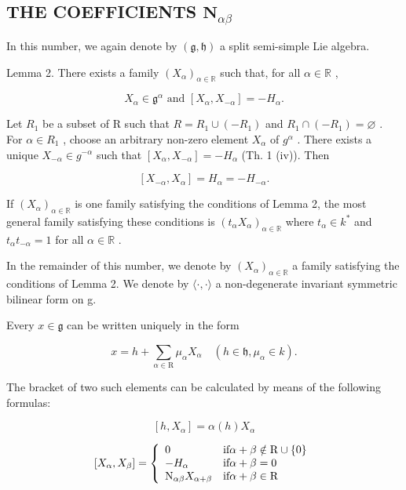 \subsection{\texorpdfstring{THE COEFFICIENTS \(\mathbf{N}_{\alpha \beta}\)}{THE COEFFICIENTS \textbackslash mathbf\{N\}\_\{\textbackslash alpha \textbackslash beta\}}}

In this number, we again denote by \((\mathfrak{g},\mathfrak{h})\) a split semi-simple Lie algebra.

Lemma 2. There exists a family \((X_{\alpha})_{\alpha \in \mathbb{R}}\) such that, for all \(\alpha \in \mathbb{R}\) ,

\[
X _ {\alpha} \in \mathfrak {g} ^ {\alpha} \text { and } [ X _ {\alpha}, X _ {- \alpha} ] = - H _ {\alpha}.
\]

Let \(R_{1}\) be a subset of R such that \(R = R_{1} \cup (-R_{1})\) and \(R_{1} \cap (-R_{1}) = \varnothing\) . For \(\alpha \in R_{1}\) , choose an arbitrary non-zero element \(X_{\alpha}\) of \(g^{\alpha}\) . There exists a unique \(X_{-\alpha} \in g^{-\alpha}\) such that \([X_{\alpha}, X_{-\alpha}] = -H_{\alpha}\) (Th. 1 (iv)). Then

\[
\left[ X _ {- \alpha}, X _ {\alpha} \right] = H _ {\alpha} = - H _ {- \alpha}.\tag{Q.E.D.}
\]

If \((X_{\alpha})_{\alpha \in \mathbb{R}}\) is one family satisfying the conditions of Lemma 2, the most general family satisfying these conditions is \((t_{\alpha}X_{\alpha})_{\alpha \in \mathbb{R}}\) where \(t_{\alpha}\in k^{*}\) and \(t_{\alpha}t_{-\alpha} = 1\) for all \(\alpha \in \mathbb{R}\) .

In the remainder of this number, we denote by \((X_{\alpha})_{\alpha\in\mathbb{R}}\) a family satisfying the conditions of Lemma 2. We denote by \(\langle\cdot,\cdot\rangle\) a non-degenerate invariant symmetric bilinear form on g.

Every \(x \in \mathfrak{g}\) can be written uniquely in the form

\[
x = h + \sum_ {\alpha \in \mathrm{R}} \mu_ {\alpha} X _ {\alpha} \quad (h \in \mathfrak {h}, \mu_ {\alpha} \in k).
\]

The bracket of two such elements can be calculated by means of the following formulas:

\[
[ h, X _ {\alpha} ] = \alpha (h) X _ {\alpha}
\]

\[
[ X _ {\alpha}, X _ {\beta} ] = \left\{ \begin{array}{l l} 0 & \text {if} \alpha + \beta \notin \mathrm{R} \cup \{0 \} \\ - H _ {\alpha} & \text {if} \alpha + \beta = 0 \\ \mathrm{N} _ {\alpha \beta} X _ {\alpha + \beta} & \text {if} \alpha + \beta \in \mathrm{R} \end{array} \right.
\]

